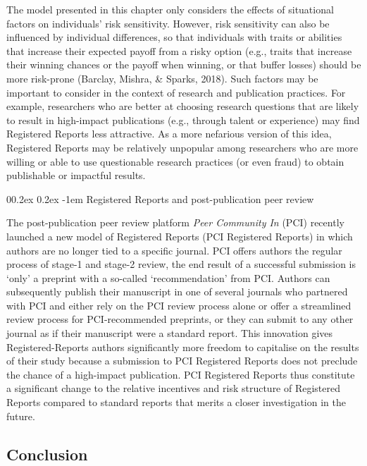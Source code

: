 \documentclass[
  ,man,mask,floatsintext]{apa6}
\makeatletter
\let\oldparagraph\paragraph
\renewcommand{\paragraph}[1]{\oldparagraph{#1}\mbox{}}
\renewcommand{\paragraph}{\@startsection{paragraph}{4}{\parindent}%
  {0\baselineskip \@plus 0.2ex \@minus 0.2ex}%
  {-1em}%
  {\normalfont\normalsize\bfseries\itshape\typesectitle}}
\makeatother
\begin{document}
The model presented in this chapter only considers the effects of situational factors on individuals' risk sensitivity.
However, risk sensitivity can also be influenced by individual differences, so that individuals with traits or abilities that increase their expected payoff from a risky option (e.g., traits that increase their winning chances or the payoff when winning, or that buffer losses) should be more risk-prone (Barclay, Mishra, \& Sparks, 2018).
Such factors may be important to consider in the context of research and publication practices.
For example, researchers who are better at choosing research questions that are likely to result in high-impact publications (e.g., through talent or experience) may find Registered Reports less attractive.
As a more nefarious version of this idea, Registered Reports may be relatively unpopular among researchers who are more willing or able to use questionable research practices (or even fraud) to obtain publishable or impactful results.

\hypertarget{registered-reports-and-post-publication-peer-review}{%
\paragraph{Registered Reports and post-publication peer review}\label{registered-reports-and-post-publication-peer-review}}

The post-publication peer review platform \emph{Peer Community In} (PCI) recently launched a new model of Registered Reports (PCI Registered Reports) in which authors are no longer tied to a specific journal.
PCI offers authors the regular process of stage-1 and stage-2 review, the end result of a successful submission is `only' a preprint with a so-called `recommendation' from PCI.
Authors can subsequently publish their manuscript in one of several journals who partnered with PCI and either rely on the PCI review process alone or offer a streamlined review process for PCI-recommended preprints, or they can submit to any other journal as if their manuscript were a standard report.
This innovation gives Registered-Reports authors significantly more freedom to capitalise on the results of their study because a submission to PCI Registered Reports does not preclude the chance of a high-impact publication.
PCI Registered Reports thus constitute a significant change to the relative incentives and risk structure of Registered Reports compared to standard reports that merits a closer investigation in the future.

\hypertarget{conclusion}{%
\subsection{Conclusion}\label{conclusion}}
\end{document}
